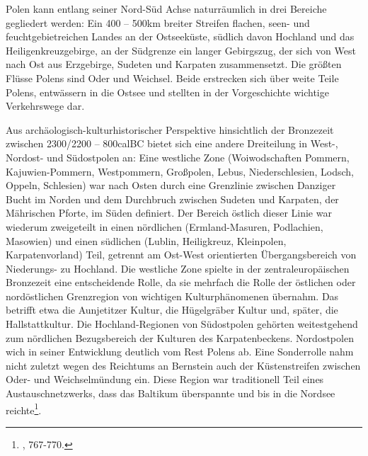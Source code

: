 \documentclass[openany,twoside,twocolumn]{book}
\let\rmarkdownfootnote\footnote%
\def\footnote{\protect\rmarkdownfootnote}
\begin{document}
Polen kann entlang seiner Nord-Süd Achse naturräumlich in drei Bereiche
gegliedert werden: Ein 400 -- 500km breiter Streifen flachen, seen- und
feuchtgebietreichen Landes an der Ostseeküste, südlich davon Hochland
und das Heiligenkreuzgebirge, an der Südgrenze ein langer Gebirgszug,
der sich von West nach Ost aus Erzgebirge, Sudeten und Karpaten
zusammensetzt. Die größten Flüsse Polens sind Oder und Weichsel. Beide
erstrecken sich über weite Teile Polens, entwässern in die Ostsee und
stellten in der Vorgeschichte wichtige Verkehrswege dar.

Aus archäologisch-kulturhistorischer Perspektive hinsichtlich der
Bronzezeit zwischen 2300/2200 -- 800calBC bietet sich eine andere
Dreiteilung in West-, Nordost- und Südostpolen an: Eine westliche Zone
(Woiwodschaften Pommern, Kajuwien-Pommern, Westpommern, Großpolen,
Lebus, Niederschlesien, Lodsch, Oppeln, Schlesien) war nach Osten durch
eine Grenzlinie zwischen Danziger Bucht im Norden und dem Durchbruch
zwischen Sudeten und Karpaten, der Mährischen Pforte, im Süden
definiert. Der Bereich östlich dieser Linie war wiederum zweigeteilt in
einen nördlichen (Ermland-Masuren, Podlachien, Masowien) und einen
südlichen (Lublin, Heiligkreuz, Kleinpolen, Karpatenvorland) Teil,
getrennt am Ost-West orientierten Übergangsbereich von Niederungs- zu
Hochland. Die westliche Zone spielte in der zentraleuropäischen
Bronzezeit eine entscheidende Rolle, da sie mehrfach die Rolle der
östlichen oder nordöstlichen Grenzregion von wichtigen Kulturphänomenen
übernahm. Das betrifft etwa die Aunjetitzer Kultur, die Hügelgräber
Kultur und, später, die Hallstattkultur. Die Hochland-Regionen von
Südostpolen gehörten weitestgehend zum nördlichen Bezugsbereich der
Kulturen des Karpatenbeckens. Nordostpolen wich in seiner Entwicklung
deutlich vom Rest Polens ab. Eine Sonderrolle nahm nicht zuletzt wegen
des Reichtums an Bernstein auch der Küstenstreifen zwischen Oder- und
Weichselmündung ein. Diese Region war traditionell Teil eines
Austauschnetzwerks, dass das Baltikum überspannte und bis in die Nordsee
reichte\footnote{\textcite{czebreszuk_bronze_2013}, 767-770.}.
\end{document}
